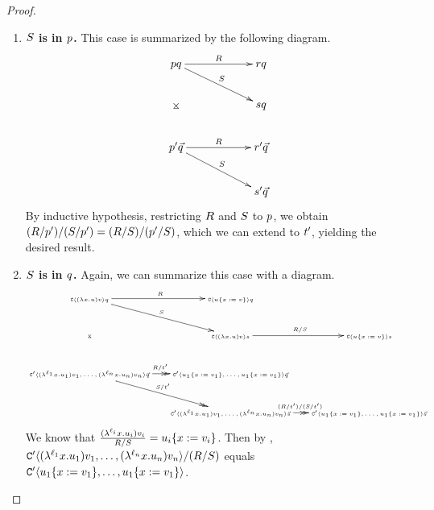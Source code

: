 \begin{proof}
\begin{enumerate}
\begin{enumerate}
\begin{enumerate}
          \item {\bf $S$ is in $p$.} This case is summarized by the following diagram.
            \[
            \xymatrix@C=2cm{
              \tmfive \tmsix
                \ar@{->}[r]^{\redex} \ar@{->}[rd]^{\redextwo} \ar@{}[dd]|*=0[@]{\rtimes}
                  & \tmfour \tmsix \\
                & \tmtwo \tmsix \\
                \ar@{->}[r]^{\redex} \ar@{->}[rd]^{\redextwo}
              \tmfive' \ls{\tmsix}
                  & \tmfour' \ls{\tmsix} \\
                & \tmtwo' \ls{\tmsix} \\
              }
            \]
            By inductive hypothesis, restricting $R$ and $S$ to $p$, we obtain
            $(R / p') / (S / p') = (R / S) / (p' / S)$,
            which we can extend to $t'$, yielding the desired result.
          \item {\bf $S$ is in $q$.} Again, we can summarize this case with a diagram.
            \[
            {\tiny
              \xymatrix@C=.5cm{
              \conof{(\lam{\var}{\tmthree}) \tmthreevariant} \tmsix
                \ar@{->}[r]^{\redex} \ar@{->}[rd]^{\redextwo} \ar@{}[dd]|*=0[@]{\rtimes}
                  & \conof{\subs{\tmthree}{\var}{\tmthreevariant}} \tmsix  & \\
                & \conof{(\lam{\var}{\tmthree}) \tmthreevariant} \tmtwo \ar@{->}[r]^{\redex / \redextwo}
                    & \conof{\subs{\tmthree}{\var}{\tmthreevariant}} \tmtwo \\
                \ar@{->>}[r]^{\redex / \tm'} \ar@{->>}[rd]^{\redextwo / \tm'}
              \contwoof{(\lamp{\lab_1}{\var}{\tmthree_1}) \tmthreevariant_1, \hdots, (\lamp{\lab_n}{\var}{\tmthree_n}) \tmthreevariant_n} \ls{\tmsix}
                  & \contwoof{\subs{\tmthree_1}{\var}{\tmthreevariant_1}, \hdots, \subs{\tmthree_1}{\var}{\tmthreevariant_1}} \ls{\tmsix} & \\
                & \contwoof{(\lamp{\lab_1}{\var}{\tmthree_1}) \tmthreevariant_1, \hdots, (\lamp{\lab_n}{\var}{\tmthree_n}) \tmthreevariant_n} \ls{\tmtwo} \ar@{->>}[r]^{(\redex / \tm') / (\redextwo / \tm')}
                  & \contwoof{\subs{\tmthree_1}{\var}{\tmthreevariant_1}, \hdots, \subs{\tmthree_1}{\var}{\tmthreevariant_1}} \ls{\tmtwo} \\
              }
            }
            \]
            We know that $\frac{(\lambda^{\ell_i} x. u_i) v_i}{R / S}
             = u_i\{x := v_i\}$.
            Then by ,
            $\mathtt{C}'\langle(\lambda^{\ell_1} x. u_1) v_1, \hdots, (\lambda^{\ell_n} x. u_n) v_n\rangle / (R / S)$ equals
            $\mathtt{C}'\langle u_1\{x := v_1\}, \hdots, u_1\{x := v_1\}\rangle$.


\end{enumerate}
\end{enumerate}
\end{enumerate}
\end{proof}
